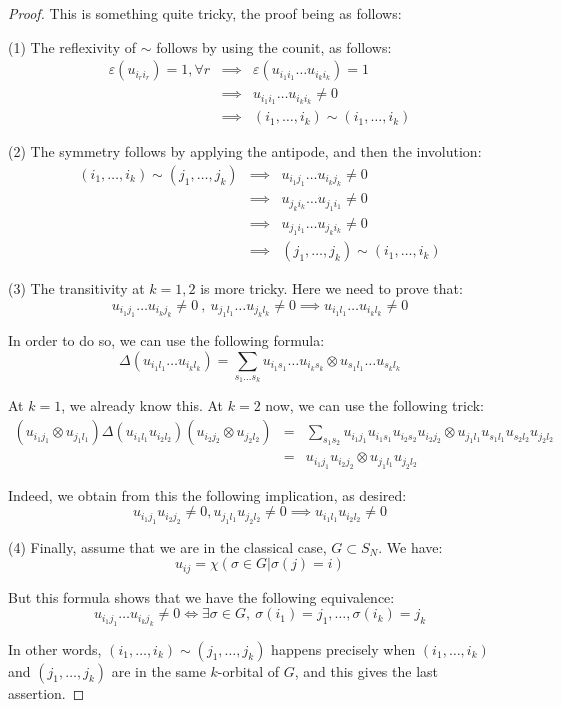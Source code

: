 \documentclass[12pt]{amsbook}
\begin{document}
\begin{proof}
This is something quite tricky, the proof being as follows:

\medskip

(1) The reflexivity of $\sim$ follows by using the counit, as follows:
\begin{eqnarray*}
\varepsilon(u_{i_ri_r})=1,\forall r
&\implies&\varepsilon(u_{i_1i_1}\ldots u_{i_ki_k})=1\\
&\implies&u_{i_1i_1}\ldots u_{i_ki_k}\neq0\\
&\implies&(i_1,\ldots,i_k)\sim(i_1,\ldots,i_k)
\end{eqnarray*}

(2) The symmetry follows by applying the antipode, and then the involution:
\begin{eqnarray*}
(i_1,\ldots,i_k)\sim(j_1,\ldots,j_k)
&\implies&u_{i_1j_1}\ldots u_{i_kj_k}\neq0\\
&\implies&u_{j_ki_k}\ldots u_{j_1i_1}\neq0\\
&\implies&u_{j_1i_1}\ldots u_{j_ki_k}\neq0\\
&\implies&(j_1,\ldots,j_k)\sim(i_1,\ldots,i_k)
\end{eqnarray*}

(3) The transitivity at $k=1,2$ is more tricky. Here we need to prove that:
$$u_{i_1j_1}\ldots u_{i_kj_k}\neq0\ ,\ u_{j_1l_1}\ldots u_{j_kl_k}\neq0\implies u_{i_1l_1}\ldots u_{i_kl_k}\neq0$$

In order to do so, we can use the following formula:
$$\Delta(u_{i_1l_1}\ldots u_{i_kl_k})=\sum_{s_1\ldots s_k}u_{i_1s_1}\ldots u_{i_ks_k}\otimes u_{s_1l_1}\ldots u_{s_kl_k}$$

At $k=1$, we already know this. At $k=2$ now, we can use the following trick:
\begin{eqnarray*}
(u_{i_1j_1}\otimes u_{j_1l_1})\Delta(u_{i_1l_1}u_{i_2l_2})(u_{i_2j_2}\otimes u_{j_2l_2})
&=&\sum_{s_1s_2}u_{i_1j_1}u_{i_1s_1}u_{i_2s_2}u_{i_2j_2}\otimes u_{j_1l_1}u_{s_1l_1}u_{s_2l_2}u_{j_2l_2}\\
&=&u_{i_1j_1}u_{i_2j_2}\otimes u_{j_1l_1}u_{j_2l_2}
\end{eqnarray*}

Indeed, we obtain from this the following implication, as desired:
$$u_{i_1j_1}u_{i_2j_2}\neq0,u_{j_1l_1}u_{j_2l_2}\neq0\implies u_{i_1l_1}u_{i_2l_2}\neq0$$

(4) Finally, assume that we are in the classical case, $G\subset S_N$. We have:
$$u_{ij}=\chi\left(\sigma\in G\Big|\sigma(j)=i\right)$$

But this formula shows that we have the following equivalence:
$$u_{i_1j_1}\ldots u_{i_kj_k}\neq0\iff\exists \sigma\in G,\ \sigma(i_1)=j_1,\ldots,\sigma(i_k)=j_k$$

In other words, $(i_1,\ldots,i_k)\sim(j_1,\ldots,j_k)$ happens precisely when $(i_1,\ldots,i_k)$ and $(j_1,\ldots,j_k)$ are in the same $k$-orbital of $G$, and this gives the last assertion.
\end{proof}
\end{document}
